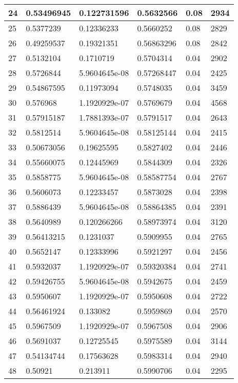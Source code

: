 \begin{longtable}{|l|l|l|l|l|l|}
24 & 0.53496945 & 0.122731596 & 0.5632566 & 0.08 & 2934 \\ \hline 
25 & 0.5377239 & 0.12336233 & 0.5660252 & 0.08 & 2829 \\ \hline 
26 & 0.49259537 & 0.19321351 & 0.56863296 & 0.08 & 2842 \\ \hline 
27 & 0.5132104 & 0.1710719 & 0.5704314 & 0.04 & 2902 \\ \hline 
28 & 0.5726844 & 5.9604645e-08 & 0.57268447 & 0.04 & 2425 \\ \hline 
29 & 0.54867595 & 0.11973094 & 0.5748035 & 0.04 & 3459 \\ \hline 
30 & 0.576968 & 1.1920929e-07 & 0.5769679 & 0.04 & 4568 \\ \hline 
31 & 0.57915187 & 1.7881393e-07 & 0.5791517 & 0.04 & 2643 \\ \hline 
32 & 0.5812514 & 5.9604645e-08 & 0.58125144 & 0.04 & 2415 \\ \hline 
33 & 0.50673056 & 0.19625595 & 0.5827402 & 0.04 & 2446 \\ \hline 
34 & 0.55660075 & 0.12445969 & 0.5844309 & 0.04 & 2326 \\ \hline 
35 & 0.5858775 & 5.9604645e-08 & 0.58587754 & 0.04 & 2767 \\ \hline 
36 & 0.5606073 & 0.12233457 & 0.5873028 & 0.04 & 2398 \\ \hline 
37 & 0.5886439 & 5.9604645e-08 & 0.58864385 & 0.04 & 2391 \\ \hline 
38 & 0.5640989 & 0.120266266 & 0.58973974 & 0.04 & 3120 \\ \hline 
39 & 0.56413215 & 0.1231037 & 0.5909955 & 0.04 & 2765 \\ \hline 
40 & 0.5652147 & 0.12333996 & 0.5921297 & 0.04 & 2456 \\ \hline 
41 & 0.5932037 & 1.1920929e-07 & 0.59320384 & 0.04 & 2741 \\ \hline 
42 & 0.59426755 & 5.9604645e-08 & 0.5942675 & 0.04 & 2459 \\ \hline 
43 & 0.5950607 & 1.1920929e-07 & 0.5950608 & 0.04 & 2722 \\ \hline 
44 & 0.56461924 & 0.133082 & 0.5959869 & 0.04 & 2570 \\ \hline 
45 & 0.5967509 & 1.1920929e-07 & 0.5967508 & 0.04 & 2906 \\ \hline 
46 & 0.5691037 & 0.12725545 & 0.5975589 & 0.04 & 3144 \\ \hline 
47 & 0.54134744 & 0.17563628 & 0.5983314 & 0.04 & 2940 \\ \hline 
48 & 0.50921 & 0.213911 & 0.5990706 & 0.04 & 2295 \\ \hline 

\end{longtable}
